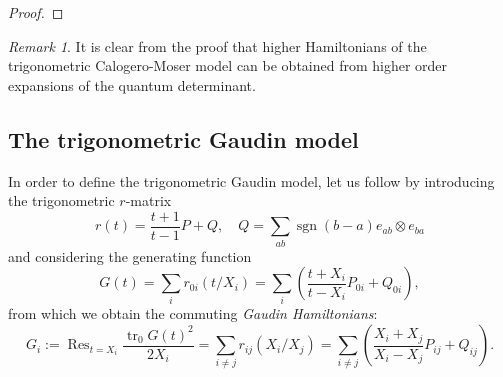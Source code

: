 \documentclass[11pt]{report}
\theoremstyle{definition}
\theoremstyle{remark}
\newtheorem*{remark}{Remark}
\theoremstyle{remark}
\begin{document}
\begin{proof}
\end{proof}

\begin{remark}
It is clear from the proof that higher Hamiltonians of the trigonometric Calogero-Moser model can be obtained from higher order expansions of the quantum determinant.
\end{remark}

\subsection{The trigonometric Gaudin model}

In order to define the trigonometric Gaudin model, let us follow \cite{article:molev:2019} by introducing the trigonometric $r$-matrix
\begin{equation*}
r(t) = \frac{t+1}{t-1} P + Q, \quad Q = \sum_{ab} \operatorname{sgn}(b-a) e_{ab} \otimes e_{ba}
\end{equation*}
and considering the generating function
\begin{equation*}
G(t) = \sum_i r_{0i}(t/X_i) = \sum_i \left( \frac{t+X_i}{t-X_i} P_{0i} + Q_{0i} \right),
\end{equation*}
from which we obtain the commuting \emph{Gaudin Hamiltonians}:
\begin{equation*}
G_i := \operatorname{Res}_{t=X_i} \frac{\operatorname{tr}_0 G(t)^2}{2 X_i} = \sum_{i \neq j} r_{ij}(X_i/X_j) = \sum_{i \neq j} \left( \frac{X_i+X_j}{X_i-X_j} P_{ij} + Q_{ij} \right).
\end{equation*}
\end{document}
